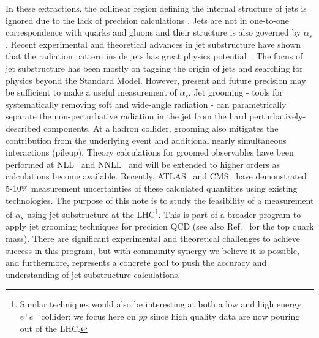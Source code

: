 In these extractions, the collinear region defining the internal
structure of jets is ignored due to the lack of precision calculations
.  Jets are not in one-to-one correspondence with
quarks and gluons and their structure is also governed by $\alpha_s$.
Recent experimental and theoretical advances in jet substructure have
shown that the radiation pattern inside jets has great physics
potential~\cite{Abdesselam:2010pt,Altheimer:2012mn,Altheimer:2013yza,Adams:2015hiv,Larkoski:2017jix}.
The focus of jet substructure has been mostly on tagging the origin of
jets and searching for physics beyond the Standard Model.  However,
present and future precision may be sufficient to make a useful
measurement of $\alpha_s$.  Jet grooming - tools for systematically
removing soft and wide-angle radiation - can parametrically separate
the non-perturbative radiation in the jet from the hard
perturbatively-described components.  At a hadron collider, grooming
also mitigates the contribution from the underlying event and
additional nearly simultaneous interactions (pileup).  Theory
calculations for groomed observables have been performed at
NLL~\cite{Marzani:2017kqd,Marzani:2017mva} and
NNLL~\cite{Frye:2016aiz,Frye:2016okc} and will be extended to higher
orders as calculations become available.  Recently,
ATLAS~\cite{Aaboud:2017qwh} and CMS~\cite{CMS-PAS-SMP-16-010} have
demonstrated 5-10\% measurement uncertainties of these calculated
quantities using existing technologies.  The purpose of this note is
to study the feasibility of a measurement of $\alpha_s$ using jet
substructure at the LHC\footnote{Similar techniques would also be
  interesting at both a low and high energy $e^+e^-$ collider; we
  focus here on $pp$ since high quality data are now pouring out of
  the LHC.}.  This is part of a broader program to apply jet grooming
techniques for precision QCD (see also Ref.~\cite{Hoang:2017kmk} for
the top quark mass).  There are significant experimental and
theoretical challenges to achieve success in this program, but with
community synergy we believe it is possible, and furthermore,
represents a concrete goal to push the accuracy and understanding of
jet substructure calculations.



